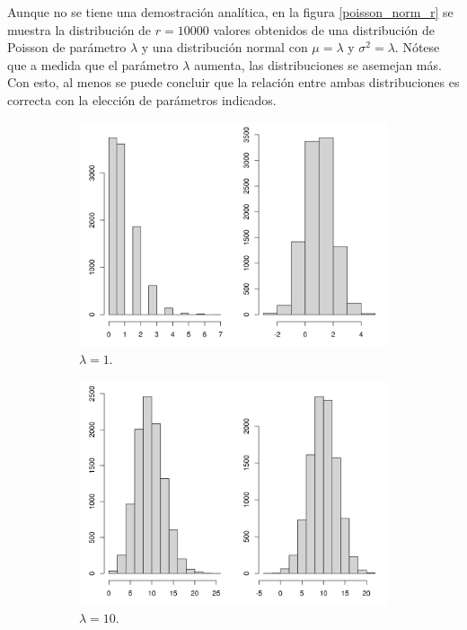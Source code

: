 \documentclass[12pt]{article}
\begin{document}
	Aunque no se tiene una demostración analítica, en la figura \ref{poisson_norm_r} se muestra la distribución de $r=10000$ valores obtenidos de una distribución de Poisson de parámetro $\lambda$ y una distribución normal con $\mu = \lambda$ y $\sigma^2 = \lambda$. Nótese que a medida que el parámetro $\lambda$ aumenta, las distribuciones se asemejan más. Con esto, al menos se puede concluir que la relación entre ambas distribuciones es correcta con la elección de parámetros indicados.
	
	\begin{figure}
		\begin{subfigure}{\textwidth}
			\centering
			\includegraphics[width=0.5\linewidth]{poisson_normal_vl1.png}
			\caption{$\lambda = 1$.}
			\label{poisson_norm1}
		\end{subfigure}
		\begin{subfigure}{\textwidth}
			\centering
			\includegraphics[scale=0.5]{poisson_normal_vl10.png}
			\caption{$\lambda=10$.}
			\label{poisson_norm10}
		\end{subfigure}
		\begin{subfigure}{\textwidth}
			\centering

\end{subfigure}
\end{figure}
\end{document}
